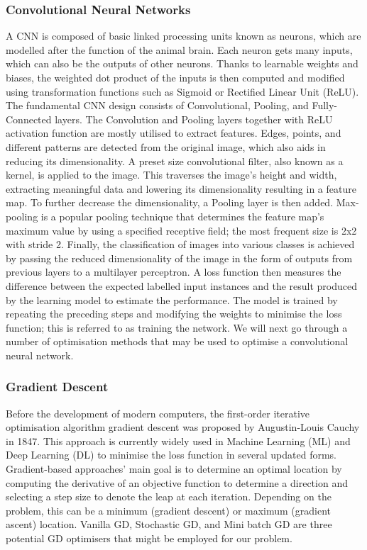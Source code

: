 \documentclass[conference]{IEEEtran}
\begin{document}
\subsubsection{Convolutional Neural Networks}
A CNN is composed of basic linked processing units known as neurons, which are modelled after the function of the animal brain. Each neuron gets many inputs, which can also be the outputs of other neurons. Thanks to learnable weights and biases, the weighted dot product of the inputs is then computed and modified using transformation functions such as Sigmoid or Rectified Linear Unit (ReLU). The fundamental CNN design consists of Convolutional, Pooling, and Fully-Connected layers. The Convolution and Pooling layers together with ReLU activation function are mostly utilised to extract features. Edges, points, and different patterns are detected from the original image, which also aids in reducing its dimensionality.  A preset size convolutional filter, also known as a kernel, is applied to the image. This traverses the image's height and width, extracting meaningful data and lowering its dimensionality resulting in a feature map. To further decrease the dimensionality, a Pooling layer is then added. Max-pooling is a popular pooling technique that determines the feature map's maximum value by using a specified receptive field; the most frequent size is 2x2 with stride 2. Finally, the classification of images into various classes is achieved by passing the reduced dimensionality of the image in the form of outputs from previous layers to a multilayer perceptron. A loss function then measures the difference between the expected labelled input instances and the result produced by the learning model to estimate the performance. The model is trained by repeating the preceding steps and modifying the weights to minimise the loss function; this is referred to as training the network. We will next go through a number of optimisation methods that may be used to optimise a convolutional neural network.
\subsubsection{Gradient Descent}
Before the development of modern computers, the first-order iterative optimisation algorithm gradient descent was proposed by Augustin-Louis Cauchy in 1847. This approach is currently widely used in Machine Learning (ML) and Deep Learning (DL) to minimise the loss function in several updated forms. Gradient-based approaches' main goal is to determine an optimal location by computing the derivative of an objective function to determine a direction and selecting a step size to denote the leap at each iteration. Depending on the problem, this can be a minimum (gradient descent) or maximum (gradient ascent) location. Vanilla GD, Stochastic GD, and Mini batch GD are three potential GD optimisers that might be employed for our problem.
\end{document}
